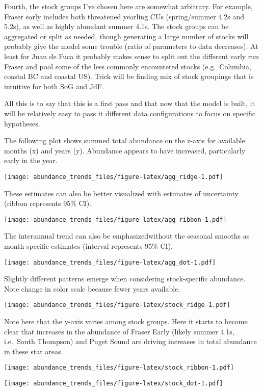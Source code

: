\documentclass[
]{article}
\begin{document}
Fourth, the stock groups I've chosen here are somewhat arbitrary. For
example, Fraser early includes both threatened yearling CUs
(spring/summer 4.2s and 5.2s), as well as highly abundant summer 4.1s.
The stock groups can be aggregated or split as needed, though generating
a large number of stocks will probably give the model some trouble
(ratio of parameters to data decreases). At least for Juan de Fuca it
probably makes sense to split out the different early run Fraser and
pool some of the less commonly encountered stocks (e.g.~Columbia,
coastal BC and coastal US). Trick will be finding mix of stock groupings
that is intuitive for both SoG and JdF.

All this is to say that this is a first pass and that now that the model
is built, it will be relatively easy to pass it different data
configurations to focus on specific hypotheses.

The following plot shows summed total abundance on the z-axis for
available months (x) and years (y). Abundance appears to have increased,
particularly early in the year.

\texttt{[image: abundance\_trends\_files/figure-latex/agg\_ridge-1.pdf]}

These estimates can also be better visualized with estimates of
uncertainty (ribbon represents 95\% CI).

\texttt{[image: abundance\_trends\_files/figure-latex/agg\_ribbon-1.pdf]}

The interannual trend can also be emphasizedwithout the seasonal smooths
as month specific estimates (interval represents 95\% CI).

\texttt{[image: abundance\_trends\_files/figure-latex/agg\_dot-1.pdf]}

Slightly different patterns emerge when considering stock-specific
abundance. Note change in color scale because fewer years available.

\texttt{[image: abundance\_trends\_files/figure-latex/stock\_ridge-1.pdf]}

Note here that the y-axis varies among stock groups. Here it starts to
become clear that increases in the abundance of Fraser Early (likely
summer 4.1s, i.e.~South Thompson) and Puget Sound are driving increases
in total abundance in these stat areas.

\texttt{[image: abundance\_trends\_files/figure-latex/stock\_ribbon-1.pdf]}

\texttt{[image: abundance\_trends\_files/figure-latex/stock\_dot-1.pdf]}
\end{document}
